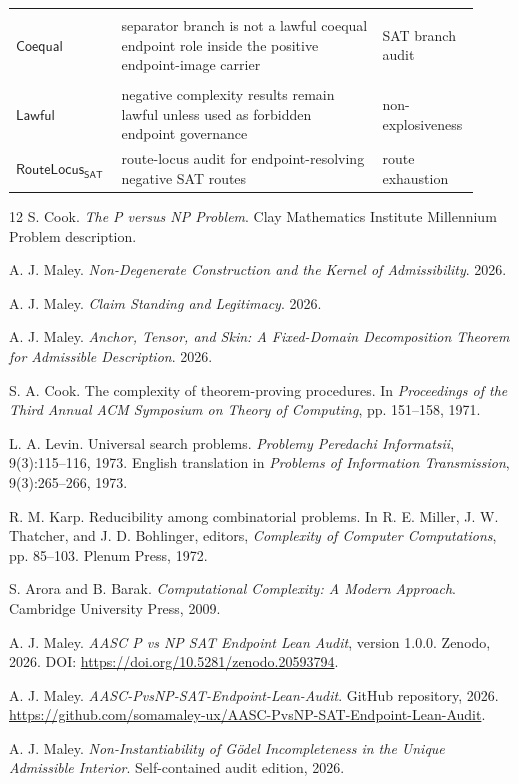 \documentclass[11pt]{article}
\theoremstyle{definition}
\theoremstyle{remark}
\newcommand{\RouteSAT}{\mathsf{RouteLocus}_{\mathsf{SAT}}}
\begin{document}
\begin{longtable}{>{\raggedright\arraybackslash}p{0.21\linewidth}>{\raggedright\arraybackslash}p{0.54\linewidth}>{\raggedright\arraybackslash}p{0.17\linewidth}}
\begin{tabular}[t]{@{}l@{}}\(\mathsf{SepNot}\)\\\(\mathsf{Coequal}\)\end{tabular} & separator branch is not a lawful coequal endpoint role inside the positive endpoint-image carrier & SAT branch audit \\
\begin{tabular}[t]{@{}l@{}}\(\mathsf{NegComplexity}\)\\\(\mathsf{Lawful}\)\end{tabular} & negative complexity results remain lawful unless used as forbidden endpoint governance & non-explosiveness \\
\(\RouteSAT\) & route-locus audit for endpoint-resolving negative SAT routes & route exhaustion \\
\bottomrule
\end{longtable}

\begin{thebibliography}{12}
S. Cook.
\emph{The P versus NP Problem}.
Clay Mathematics Institute Millennium Problem description.

A. J. Maley.
\emph{Non-Degenerate Construction and the Kernel of Admissibility}.
2026.

A. J. Maley.
\emph{Claim Standing and Legitimacy}.
2026.

A. J. Maley.
\emph{Anchor, Tensor, and Skin: A Fixed-Domain Decomposition Theorem for Admissible Description}.
2026.

S. A. Cook.
The complexity of theorem-proving procedures.
In \emph{Proceedings of the Third Annual ACM Symposium on Theory of Computing},
pp. 151--158, 1971.

L. A. Levin.
Universal search problems.
\emph{Problemy Peredachi Informatsii}, 9(3):115--116, 1973.
English translation in \emph{Problems of Information Transmission}, 9(3):265--266, 1973.

R. M. Karp.
Reducibility among combinatorial problems.
In R. E. Miller, J. W. Thatcher, and J. D. Bohlinger, editors,
\emph{Complexity of Computer Computations},
pp. 85--103. Plenum Press, 1972.

S. Arora and B. Barak.
\emph{Computational Complexity: A Modern Approach}.
Cambridge University Press, 2009.

A. J. Maley.
\emph{AASC P vs NP SAT Endpoint Lean Audit}, version 1.0.0.
Zenodo, 2026. DOI: \url{https://doi.org/10.5281/zenodo.20593794}.

A. J. Maley.
\emph{AASC-PvsNP-SAT-Endpoint-Lean-Audit}.
GitHub repository, 2026. \url{https://github.com/somamaley-ux/AASC-PvsNP-SAT-Endpoint-Lean-Audit}.

A. J. Maley.
\emph{Non-Instantiability of G\"odel Incompleteness in the Unique Admissible Interior}.
Self-contained audit edition, 2026.
\end{thebibliography}
\end{document}
